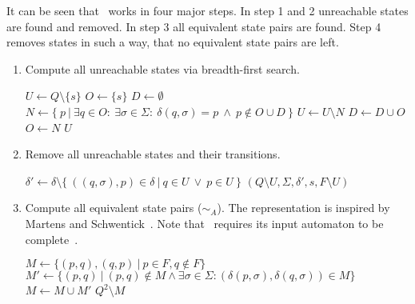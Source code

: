 \noindent It can be seen that \MinAlg\ works in four major steps. In step 1 and 2 unreachable states are found and removed. In step 3 all equivalent state pairs are found. Step 4 removes states in such a way, that no equivalent state pairs are left.
\begin{enumerate}
	\item Compute all unreachable states via breadth-first search.
	
	\vspace{0.2cm}
	\begin{algorithmic}[1]
			\State $U \gets Q \setminus \{s\}$	
			\State $O \gets \{s\}$				
			\State $D \gets \emptyset$				
				\State $N \gets \{\ p\ | \ \exists q \in O\colon\ \exists\sigma \in \Sigma \colon\ \delta(q, \sigma) = p\ \land\ p \notin O \cup D\ \}$
				\State $U \gets U \setminus N$
				\State $D \gets D \cup O$
				\State $O \gets N$
			\EndWhile
			\State \Return $U$
		\EndFunction
	\end{algorithmic}

	\item Remove all unreachable states and their transitions.
	
	\vspace{0.2cm}
	\begin{algorithmic}[1]
            \State $\delta' \gets \delta \setminus \{\ ((q,\sigma),p)\in\delta\ |\ q\in U\ \lor\ p\in U\ \}$
			\State \Return $(Q \setminus U, \Sigma, \delta', s, F \setminus U)$
		\EndFunction
	\end{algorithmic}

	\item Compute all equivalent state pairs ($\sim_A$). The representation is inspired by Martens and Schwentick~\cite[ch.~4, p.~17]{MS18}. Note that \CompDist\ requires its input automaton to be complete~\cite[p.~13]{BBC10}.
	\vspace{0.2cm}
	\begin{algorithmic}[1]
		 \label{ch:2:minmark}
		\State $M \gets \{ (p,q), (q,p)\ |\ p \in F, q \notin F \}$
		\Do
			\State $M' \gets \{ (p,q)\ |\ (p,q) \notin M \land \exists \sigma \in \Sigma \colon (\delta(p,\sigma), \delta(q,\sigma)) \in M \}$
			\State $M \gets M \cup M'$
		\State \Return $Q^2 \setminus M$
		\EndFunction
	\end{algorithmic}


\end{enumerate}
